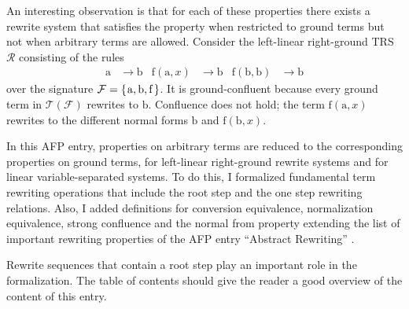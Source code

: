 \documentclass[11pt,a4paper]{article}
\newcommand{\h}[1][.3]{\hspace{#1mm}}
\newcommand{\SET}[1]{\{\h #1\h\}}
\newcommand{\m}[1]{\mathrm{#1}}
\newcommand{\xR}{\mathcal{R}}
\newcommand{\R}{\rightarrow}
\newcommand{\xF}{\mathcal{F}}
\newcommand{\xT}{\mathcal{T}}
\newcommand{\GT}[1][\xF]{\xT(#1)}
\begin{document}
An interesting observation is that for each of these properties there
exists a rewrite system that satisfies the property when restricted to
ground terms but not when arbitrary terms are allowed.
Consider the left-linear right-ground TRS $\xR$ consisting of the rules
\begin{align*}
\m{a} &\R \m{b} &
\m{f}(\m{a},x) &\R \m{b} &
\m{f}(\m{b},\m{b}) &\R \m{b}
\end{align*}
over the signature $\xF = \SET{\m{a},\m{b},\m{f}}$. It is ground-confluent
because every ground term in $\GT$ rewrites to $\m{b}$. Confluence does
not hold; the term $\m{f}(\m{a},x)$ rewrites to the different normal forms
$\m{b}$ and $\m{f}(\m{b},x)$.

In this AFP entry, properties on arbitrary terms are reduced to the
corresponding properties on ground terms, for left-linear right-ground
rewrite systems and for linear variable-separated systems.
To do this, I formalized fundamental term rewriting operations that
include the root step and the one step rewriting relations. Also, I added definitions for
conversion equivalence, normalization equivalence,
strong confluence and the normal from property extending
the list of important rewriting properties of the AFP entry
``Abstract Rewriting'' \cite{AFP-CSRT}.

Rewrite sequences that contain a root step play an important role
in the formalization. The table of contents should give the reader a good overview
of the content of this entry.






\end{document}
